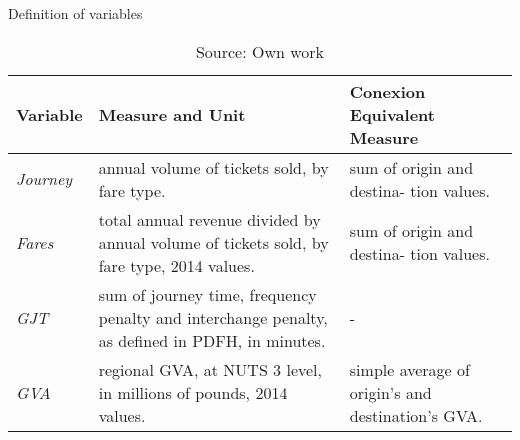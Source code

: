 
\begin{table}[!ht] \centering 
  \caption{Definition of variables} 
  \label{tbl:var_units} 
{\renewcommand\arraystretch{1.25}}
\begin{tabular} {lllll}
\toprule
Variable          & \multicolumn{2}{m{6cm}}{\raggedright Measure and Unit} & \multicolumn{2}{m{5cm}}{\raggedright Conexion Equivalent Measure} \\
\hline
\textit{Journey}  &\multicolumn{2}{m{6cm}}{\raggedright annual volume of tickets sold, by fare type.} 
				  &\multicolumn{2}{m{5cm}}{\raggedright sum of origin and destina- tion values.}\\
\textit{Fares}    &\multicolumn{2}{m{6cm}}{\raggedright total annual revenue divided by annual volume of tickets sold, by fare type, 2014 values.} 
				  &\multicolumn{2}{m{5cm}}{\raggedright sum of origin and destina- tion values.}\\
\textit{GJT}      &\multicolumn{2}{m{6cm}}{\raggedright sum of journey time, frequency penalty and interchange penalty, as defined in PDFH, in minutes.} 
				  &\multicolumn{2}{m{5cm}}{\raggedright - }\\
\textit{GVA}      &\multicolumn{2}{m{6cm}}{\raggedright regional GVA, at NUTS 3 level, in millions of pounds, 2014 values.} 
				  &\multicolumn{2}{m{5cm}}{\raggedright simple average of origin's and destination's GVA.}\\
\bottomrule
\end{tabular}%
\caption*{Source: Own work}
\end{table} 

